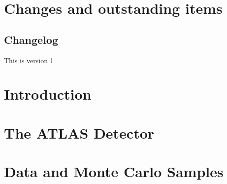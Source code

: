 \documentclass[NOTE, atlasdraft=true, texlive=2016, UKenglish]{\ATLASLATEXPATH atlasdoc}
\begin{document}
\maketitle

\begin{singlespace}
\tableofcontents
\end{singlespace}

\clearpage

\section{Changes and outstanding items}
\label{sec:changes}

\subsection{Changelog}

This is version 1

\clearpage

\section{Introduction}
\label{sec:intro}


\section{The ATLAS Detector}
\label{sec:ATLAS}


\section{Data and Monte Carlo Samples}
\label{sec:dataMC}

\end{document}
